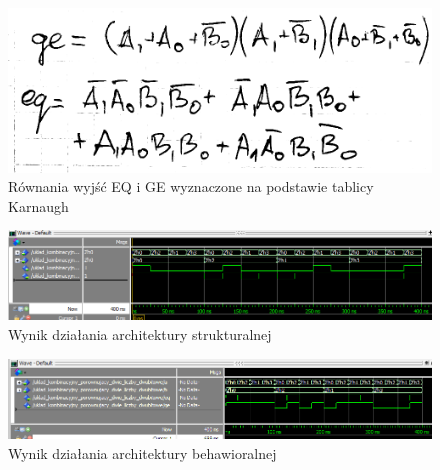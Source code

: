 \documentclass[13pt, a4paper, twoside]{mwart}
\begin{document}
\begin{figure}[h]
	\centering
	\includegraphics[width=0.4\linewidth]{geeq.png}
	\caption{Równania wyjść EQ i GE wyznaczone na podstawie tablicy Karnaugh}
\end{figure}





\begin{figure}[h]
	\centering
	\includegraphics[width=\linewidth]{compare_structural.png}
  \caption{Wynik działania architektury strukturalnej}
\end{figure}

\begin{figure}[h]
	\centering
	\includegraphics[width=\linewidth]{compare_behavioral.png}
  \caption{Wynik działania architektury behawioralnej}
\end{figure}

\end{document}
